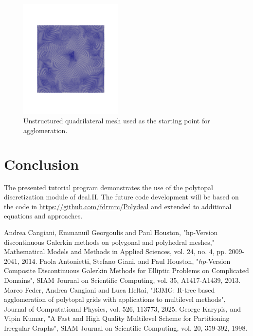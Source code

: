 \documentclass[a4paper,12pt]{article}
\begin{document}
\begin{figure}[htbp]
    \centering
    \includegraphics[width=0.46\textwidth]{unstructured_square.pdf}
    \caption{Unstructured quadrilateral mesh used as the starting point for agglomeration.}
    \label{fig:unstructured_mesh}
\end{figure}



\newpage
\section{{Conclusion}} \label{sec:conclusion}

The presented tutorial program demonstrates the use of the polytopal discretization module of deal.II. The future code development will be based on the code in \url{https://github.com/fdrmrc/Polydeal} and extended to additional equations and approaches.


\begin{thebibliography}{10}
    Andrea Cangiani, Emmanuil Georgoulis and Paul Houston, "hp-Version discontinuous Galerkin methods on polygonal and polyhedral meshes," Mathematical Models and Methods in Applied Sciences, vol. 24, no. 4, pp. 2009-2041, 2014.
    Paola Antonietti, Stefano Giani, and Paul Houston, "$hp$-Version Composite Discontinuous Galerkin Methods for Elliptic Problems on Complicated Domains", SIAM Journal on Scientific Computing, vol. 35, A1417-A1439, 2013.
    Marco Feder, Andrea Cangiani and Luca Heltai, "R3MG: R-tree based agglomeration of polytopal grids with applications to multilevel methods", Journal of Computational Physics, vol. 526, 113773, 2025.
    George Karypis, and Vipin Kumar, "A Fast and High Quality Multilevel Scheme for Partitioning Irregular Graphs", SIAM Journal on Scientific Computing, vol. 20, 359-392, 1998.
\end{thebibliography}









\label{MyLastPage}
\end{document}
